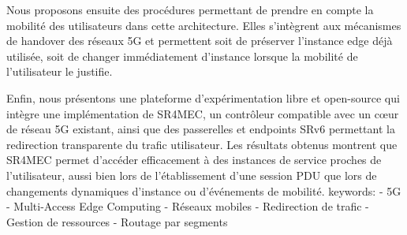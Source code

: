     Nous proposons ensuite des procédures permettant de prendre en compte la mobilité des utilisateurs dans cette architecture.
    Elles s’intègrent aux mécanismes de handover des réseaux 5G et permettent soit de préserver l’instance edge déjà utilisée, soit de changer immédiatement d’instance lorsque la mobilité de l’utilisateur le justifie.
  
    Enfin, nous présentons une plateforme d’expérimentation libre et open-source qui intègre une implémentation de SR4MEC, un contrôleur compatible avec un cœur de réseau 5G existant, ainsi que des passerelles et endpoints SRv6 permettant la redirection transparente du trafic utilisateur.
    Les résultats obtenus montrent que SR4MEC permet d’accéder efficacement à des instances de service proches de l’utilisateur, aussi bien lors de l’établissement d’une session PDU que lors de changements dynamiques d’instance ou d’événements de mobilité. 
  keywords:
  - 5G
  - Multi-Access Edge Computing
  - Réseaux mobiles
  - Redirection de trafic
  - Gestion de ressources
  - Routage par segments

